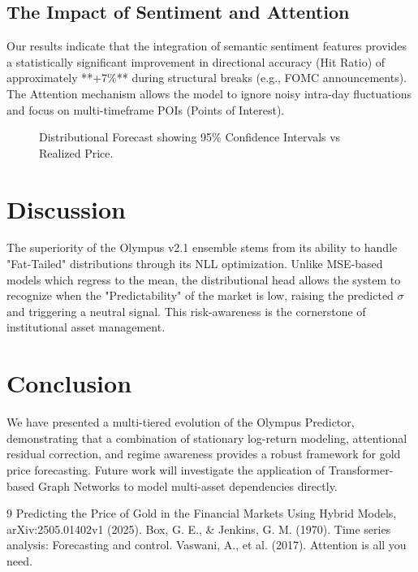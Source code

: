 \documentclass[11pt, a4paper, twocolumn]{article}
\begin{document}
\subsection{The Impact of Sentiment and Attention}
Our results indicate that the integration of semantic sentiment features provides a statistically significant improvement in directional accuracy (Hit Ratio) of approximately **+7\%** during structural breaks (e.g., FOMC announcements). The Attention mechanism allows the model to ignore noisy intra-day fluctuations and focus on multi-timeframe POIs (Points of Interest).

\begin{figure}[h]
\centering
\caption{Distributional Forecast showing 95\% Confidence Intervals vs Realized Price.}
\end{figure}

\section{Discussion}
The superiority of the Olympus v2.1 ensemble stems from its ability to handle "Fat-Tailed" distributions through its NLL optimization. Unlike MSE-based models which regress to the mean, the distributional head allows the system to recognize when the "Predictability" of the market is low, raising the predicted $\sigma$ and triggering a neutral signal. This risk-awareness is the cornerstone of institutional asset management.

\section{Conclusion}
We have presented a multi-tiered evolution of the Olympus Predictor, demonstrating that a combination of stationary log-return modeling, attentional residual correction, and regime awareness provides a robust framework for gold price forecasting. Future work will investigate the application of Transformer-based Graph Networks to model multi-asset dependencies directly.

\begin{thebibliography}{9}
 Predicting the Price of Gold in the Financial Markets Using Hybrid Models, arXiv:2505.01402v1 (2025).
 Box, G. E., \& Jenkins, G. M. (1970). Time series analysis: Forecasting and control.
 Vaswani, A., et al. (2017). Attention is all you need.
\end{thebibliography}
\end{document}
